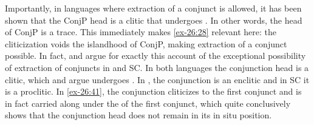 \documentclass[output=paper]{langsci/langscibook}
\begin{document}
Importantly, in languages where extraction of a conjunct is allowed, it has
been shown that the ConjP head is a clitic that undergoes . In other
words, the head of ConjP is a trace. This immediately makes \eqref{ex-26:28} relevant here:
the cliticization voids the islandhood of ConjP, making extraction of a
conjunct possible. In fact, \textcite{Oda:2017} and
\textcite{Stjepanovic2014} argue for exactly this account of the exceptional
possibility of extraction of conjuncts in  and \gls{SC}. In both languages
the conjunction head is a clitic, which \citeauthor{Oda:2017} and
\citeauthor{Stjepanovic2014} argue undergoes . In , the
conjunction is an enclitic and in \gls{SC} it is a proclitic. In  \eqref{ex-26:41},
the conjunction cliticizes to the first conjunct and is in fact carried along
under the  of the first conjunct, which quite conclusively shows that
the conjunction head does not remain in its in situ position.

\ea\label{ex-26:41}  \parencite{Oda:2017}
    \z
\z
\end{document}
